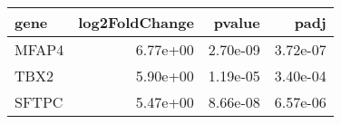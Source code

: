 \begin{tabular}{lrrr}
\toprule
 gene &  log2FoldChange &   pvalue &     padj \\
\midrule
MFAP4 &        6.77e+00 & 2.70e-09 & 3.72e-07 \\
 TBX2 &        5.90e+00 & 1.19e-05 & 3.40e-04 \\
SFTPC &        5.47e+00 & 8.66e-08 & 6.57e-06 \\
\bottomrule
\end{tabular}

